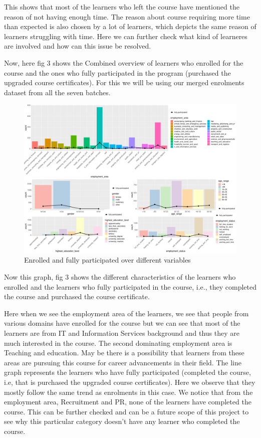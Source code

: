 \documentclass[
]{article}
\begin{document}
This shows that most of the learners who left the course have mentioned
the reason of not having enough time. The reason about course requiring
more time than expected is also chosen by a lot of learners, which
depicts the same reason of learners struggling with time. Here we can
further check what kind of learneres are involved and how can this issue
be resolved.

Now, here fig 3 shows the Combined overview of learners who enrolled for
the course and the ones who fully participated in the program (purchased
the upgraded course certificates). For this we will be using our merged
enrolments dataset from all the seven batches.

\begin{figure}
\includegraphics[width=1\linewidth]{CSC8631-Reports_files/figure-latex/unnamed-chunk-3-1} \caption{Enrolled and fully participated over different variables}\label{fig:unnamed-chunk-3}
\end{figure}

Now this graph, fig 3 shows the different characteristics of the
learners who enrolled and the learners who fully participated in the
course, i.e., they completed the course and purchased the course
certificate.

Here when we see the employment area of the learners, we see that people
from various domains have enrolled for the course but we can see that
most of the learners are from IT and Information Services background and
thus they are much interested in the course. The second dominating
employment area is Teaching and education. May be there is a possibility
that learners from these areas are pursuing this course for career
advancements in their field. The line graph represents the learners who
have fully participated (completed the course, i.e, that is purchased
the upgraded course certificates). Here we observe that they mostly
follow the same trend as enrolments in this case. We notice that from
the employment area, Recruitment and PR, none of the learners have
completed the course. This can be further checked and can be a future
scope of this project to see why this particular category doesn't have
any learner who completed the course.
\end{document}
